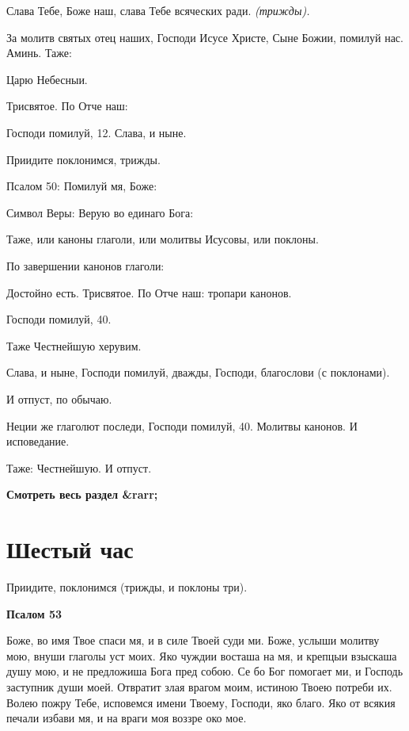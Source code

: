 Слава Тебе, Боже наш, слава Тебе всяческих ради. \itshape (трижды)\normalfont{}.


За молитв святых отец наших, Господи Исусе Христе, Сыне Божии, помилуй нас. Аминь. Таже:


Царю Небесныи.


Трисвятое. По Отче наш:


Господи помилуй, 12. Слава, и ныне.


Приидите поклонимся, трижды.


Псалом 50: Помилуй мя, Боже:


Символ Веры: Верую во единаго Бога:


Таже, или каноны глаголи, или молитвы Исусовы, или поклоны.


По завершении канонов глаголи:


Достойно есть. Трисвятое. По Отче наш: тропари канонов.


Господи помилуй, 40.


Таже Честнейшую херувим.


Слава, и ныне, Господи помилуй, дважды, Господи, благослови (с поклонами).


И отпуст, по обычаю.


Неции же глаголют последи, Господи помилуй, 40. Молитвы канонов. И исповедание.


Таже: Честнейшую. И отпуст.




\mychapterending


\bfseries Смотреть весь раздел &rarr;\normalfont{} 

\section{Шестый час}
 


Приидите, поклонимся (трижды, и поклоны три).





\bfseries Псалом 53\normalfont{}


Боже, во имя Твое спаси мя, и в силе Твоей суди ми. Боже, услыши молитву мою, внуши глаголы уст моих. Яко чуждии восташа на мя, и крепцыи взыскаша душу мою, и не предложиша Бога пред собою. Се бо Бог помогает ми, и Господь заступник души моей. Отвратит злая врагом моим, истиною Твоею потреби их. Волею пожру Тебе, исповемся имени Твоему, Господи, яко благо. Яко от всякия печали избави мя, и на враги моя воззре око мое.





